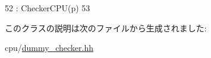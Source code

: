 \begin{DoxyCode}
52           : CheckerCPU(p)
53     { }
\end{DoxyCode}


このクラスの説明は次のファイルから生成されました:\begin{DoxyCompactItemize}
\item 
cpu/\hyperlink{dummy__checker_8hh}{dummy\_\-checker.hh}\end{DoxyCompactItemize}
